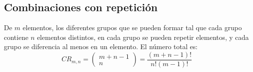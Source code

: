\documentclass{./Probabilidad.tex}
\begin{document}
\subsection{Combinaciones con repetición}
De $m$ elementos, los diferentes grupos que se pueden formar tal que cada grupo contiene $n$ elementos distintos, en cada grupo se pueden repetir elementos, y cada grupo se diferencia al menos en un elemento. El número total es:
$$
CR_{m,n} = \begin{pmatrix}
m+n-1 \\ n
\end{pmatrix} = \frac{(m+n-1)!}{n!(m-1)!}
$$
\end{document}
